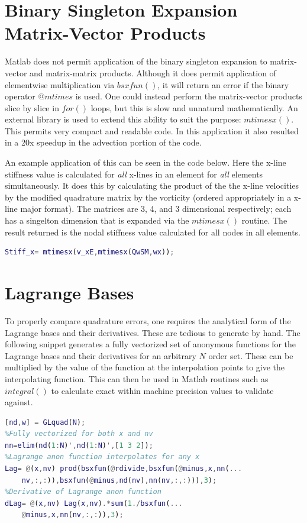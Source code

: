 \documentclass[letterpaper,12pt]{report}
\begin{document}
\section{Binary Singleton Expansion Matrix-Vector Products}
Matlab does not permit application of the binary singleton expansion to matrix-vector and matrix-matrix products. Although it does permit application of elementwise multiplication via $bsxfun()$, it will return an error if the binary operator $@mtimes$ is used. One could instead perform the matrix-vector products slice by slice in $for()$ loops, but this is slow and unnatural mathematically. An external library is used to extend this ability to suit the purpose: $mtimesx()$. This permits very compact and readable code. In this application it also resulted in a 20x speedup in the advection portion of the code.

An example application of this can be seen in the code below. Here the x-line stiffness value is calculated for \textit{all} x-lines in an element for \textit{all} elements simultaneously. It does this by calculating the product of the the x-line velocities by the modified quadrature matrix by the vorticity (ordered appropriately in a x-line major format). The matrices are 3, 4, and 3 dimensional respectively; each has a singelton dimension that is expanded via the $mtimesx()$ routine. The result returned is the nodal stiffness value calculated for all nodes in all elements.

\singlespacing
\begin{lstlisting}[language=Matlab]
%Example non-standard bsx for matrix-vector products
Stiff_x= mtimesx(v_xE,mtimesx(QwSM,wx));
\end{lstlisting}
\doublespacing

\section{Lagrange Bases}
To properly compare quadrature errors, one requires the analytical form of the Lagrange bases and their derivatives. These are tedious to generate by hand. The following snippet generates a fully vectorized set of anonymous functions for the Lagrange bases and their derivatives for an arbitrary $N$ order set. These can be multiplied by the value of the function at the interpolation points to give the interpolating function. This can then be used in Matlab routines such as $integral()$ to calculate exact within machine precision values to validate against.

\singlespacing
\begin{lstlisting}[language=Matlab]
%Generate Gauss-Legendre quadrature points for Nth order
[nd,w] = GLquad(N);
%Fully vectorized for both x and nv
nn=elim(nd(1:N)',nd(1:N)',[1 3 2]);
%Lagrange anon function interpolates for any x
Lag= @(x,nv) prod(bsxfun(@rdivide,bsxfun(@minus,x,nn(...
	nv,:,:)),bsxfun(@minus,nd(nv),nn(nv,:,:))),3);
%Derivative of Lagrange anon function
dLag= @(x,nv) Lag(x,nv).*sum(1./bsxfun(...
	@minus,x,nn(nv,:,:)),3);
\end{lstlisting}
\doublespacing
\end{document}
